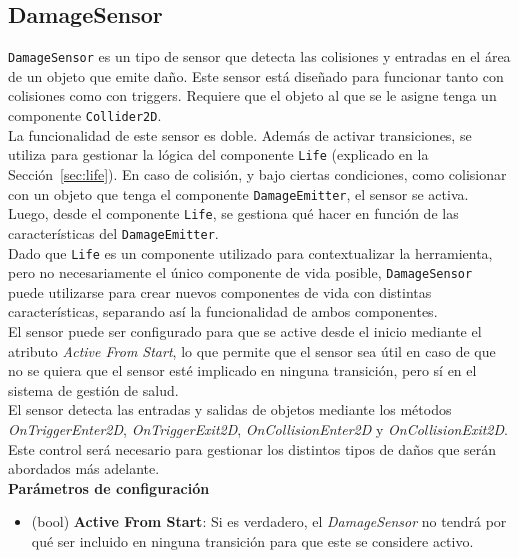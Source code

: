 \subsection{DamageSensor}

\texttt{DamageSensor} es un tipo de sensor que detecta las colisiones y entradas en el área de un objeto que emite daño. Este sensor está diseñado para funcionar tanto con colisiones como con triggers. Requiere que el objeto al que se le asigne tenga un componente \texttt{Collider2D}.\\

La funcionalidad de este sensor es doble. Además de activar transiciones, se utiliza para gestionar la lógica del componente \texttt{Life} (explicado en la Sección~\ref{sec:life}). En caso de colisión, y bajo ciertas condiciones, como colisionar con un objeto que tenga el componente \texttt{DamageEmitter}, el sensor se activa. Luego, desde el componente \texttt{Life}, se gestiona qué hacer en función de las características del \texttt{DamageEmitter}.\\

Dado que \texttt{Life} es un componente utilizado para contextualizar la herramienta, pero no necesariamente el único componente de vida posible, \texttt{DamageSensor} puede utilizarse para crear nuevos componentes de vida con distintas características, separando así la funcionalidad de ambos componentes.\\

El sensor puede ser configurado para que se active desde el inicio mediante el atributo \textit{Active From Start}, lo que permite que el sensor sea útil en caso de que no se quiera que el sensor esté implicado en ninguna transición, pero sí en el sistema de gestión de salud.\\

El sensor detecta las entradas y salidas de objetos mediante los métodos \textit{OnTriggerEnter2D}, \textit{OnTriggerExit2D}, \textit{OnCollisionEnter2D} y \textit{OnCollisionExit2D}. Este control será necesario para gestionar los distintos tipos de daños que serán abordados más adelante.\\

\textbf{Parámetros de configuración}
\begin{itemize}
	\item (bool) \textbf{Active From Start}: Si es verdadero, el \textit{DamageSensor} no tendrá por qué ser incluido en ninguna transición para que este se considere activo.
\end{itemize}

